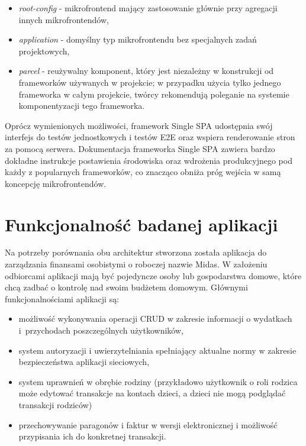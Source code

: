 \documentclass{SGGW-thesis}
\begin{document}
    \begin{itemize}
      \item \textit{root-config} - mikrofrontend mający zastosowanie głównie przy agregacji innych mikrofrontendów,
      \item \textit{application} - domyślny typ mikrofrontendu bez specjalnych zadań projektowych,
      \item \textit{parcel} - reużywalny komponent, który jest niezależny w konstrukcji od frameworków używanych w projekcie; w przypadku użycia tylko jednego frameworka w całym projekcie, twórcy rekomendują \cite{singlespa-parcels} poleganie na systemie komponentyzacji tego frameworka.
    \end{itemize}

    Oprócz wymienionych możliwości, framework Single SPA udostępnia swój interfejs do testów jednostkowych i testów E2E oraz wspiera renderowanie stron za pomocą serwera. Dokumentacja frameworka Single SPA zawiera bardzo dokładne instrukcje postawienia środowiska oraz wdrożenia produkcyjnego pod każdy z popularnych frameworków, co znacząco obniża próg wejścia w samą koncepcję mikrofrontendów.
    
\chapter{Funkcjonalność badanej aplikacji}
Na potrzeby porównania obu architektur stworzona została aplikacja do zarządzania finansami osobistymi o roboczej nazwie Midas. W założeniu odbiorcami aplikacji mają być pojedyncze osoby lub gospodarstwa domowe, które chcą zadbać o kontrolę nad swoim budżetem domowym. Głównymi funkcjonalnościami aplikacji są:

  \begin{itemize}
    \item możliwość wykonywania operacji CRUD w zakresie informacji o wydatkach i~przychodach poszczególnych użytkowników,
    \item system autoryzacji i uwierzytelniania spełniający aktualne normy w zakresie bezpieczeństwa aplikacji sieciowych,
    \item system uprawnień w obrębie rodziny (przykładowo użytkownik o roli rodzica może edytować transakcje na kontach dzieci, a dzieci nie mogą podglądać transakcji rodziców)
    \item przechowywanie paragonów i faktur w wersji elektronicznej i możliwość przypisania ich do konkretnej transakcji.
  \end{itemize}
\end{document}
